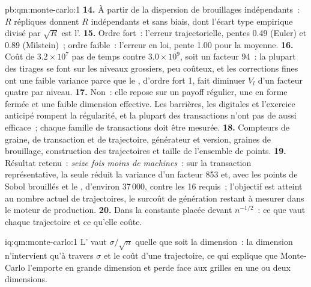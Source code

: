 \begin{solution}{pb:qm:monte-carlo:1}
\textbf{14.} À partir de la dispersion de brouillages indépendants~: $R$ répliques donnent $R$  indépendants et sans biais, dont l'écart type empirique divisé par $\sqrt R$ est l'.
\textbf{15.} Ordre fort~: l'erreur trajectorielle, pentes 0.49 (Euler) et 0.89 (Milstein)~; ordre faible~: l'erreur en loi, pente 1.00 pour la moyenne.
\textbf{16.} Coût de $3.2 \times 10^7$ pas de temps contre $3.0 \times 10^9$, soit un facteur 94~: la plupart des tirages se font sur les niveaux grossiers, peu coûteux, et les corrections fines ont une faible variance parce que le , d'ordre fort 1, fait diminuer $V_l$ d'un facteur quatre par niveau.
\textbf{17.} Non~: elle repose sur un payoff régulier, une  en forme fermée et une faible dimension effective. Les barrières, les digitales et l'exercice anticipé rompent la régularité, et la plupart des transactions n'ont pas de 
aussi efficace~; chaque famille de transactions doit être mesurée.
\textbf{18.} Compteurs de graine, de transaction et de trajectoire, générateur et version, graines de brouillage, construction des trajectoires et taille de l'ensemble de points.
\textbf{19.} Résultat retenu~: \emph{seize fois moins de machines}~: sur la transaction représentative, la seule  réduit la variance d'un facteur 853 et, avec les points de Sobol brouillés et le , d'environ
37\,000, contre les 16 requis~; l'objectif est atteint au nombre actuel de trajectoires, le surcoût de génération restant à mesurer dans le moteur de production.
\textbf{20.} Dans la constante placée devant $n^{-1/2}$~: ce que vaut chaque trajectoire et ce qu'elle coûte.
\end{solution}

\begin{solution}{iq:qm:monte-carlo:1}
L' vaut $\sigma/\sqrt n$ quelle que soit la dimension~: la dimension n'intervient qu'à travers $\sigma$ et le coût d'une trajectoire, ce qui explique que Monte-Carlo l'emporte en grande dimension et perde face aux grilles en une ou deux dimensions.
\end{solution}


